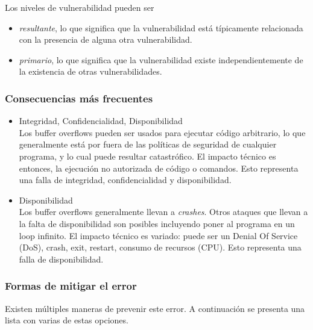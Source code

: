 Los niveles de vulnerabilidad pueden ser

\begin{itemize}
    \item \textit{resultante}, lo que significa que la vulnerabilidad está típicamente relacionada con la presencia de alguna otra vulnerabilidad.
    \item \textit{primario}, lo que significa que la vulnerabilidad existe independientemente de la existencia de otras vulnerabilidades.
\end{itemize}

\subsubsection{Consecuencias más frecuentes}

\begin{itemize}
    \item Integridad, Confidencialidad, Disponibilidad\\
        Los buffer overflows pueden ser usados para ejecutar código arbitrario, lo que generalmente está por fuera de las políticas de seguridad de cualquier programa,
     y lo cual puede resultar catastrófico. El impacto técnico es entonces, la ejecución no autorizada de código o comandos. Esto representa una falla de integridad,
    confidencialidad y disponibilidad.
    \item Disponibilidad \\
        Los buffer overflows generalmente llevan a \textit{crashes}. Otros ataques que llevan a la falta de disponibilidad son posibles incluyendo poner al programa en un loop infinito.
    El impacto técnico es variado: puede ser un Denial Of Service (DoS), crash, exit, restart, consumo de recursos (CPU). Esto representa una falla de disponibilidad.
\end{itemize}

\subsubsection{Formas de mitigar el error}

Existen múltiples maneras de prevenir este error. A continuación se presenta una lista con varias de estas opciones.

